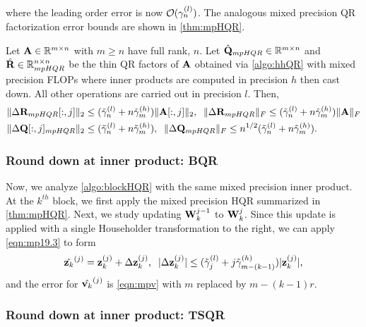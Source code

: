 where the leading order error is now $\mathcal{O}(\gamma_n^{(l)})$.
The analogous mixed precision QR factorization error bounds are shown in \cref{thm:mpHQR}.
\begin{theorem}
	\label{thm:mpHQR}
	Let $\mathbf{A}\in\mathbb{R}^{m\times n}$ with $m\geq n$ have full rank, $n$. 
	Let $\hat{\mathbf{Q}}_{mpHQR}\in\mathbb{R}^{m\times n}$ and $\hat{\mathbf{R}}\in\mathbb{R}^{n\times n}_{mpHQR}$ be the thin QR factors of $\mathbf{A}$ obtained via \cref{algo:hhQR} with mixed precision FLOPs where inner products are computed in precision $h$ then cast down.
	All other operations are carried out in precision $l$.
	Then,
	\begin{align*}
	\|\Delta \mathbf{R}_{mpHQR}[:,j]\|_2&\leq (\tilde{\gamma}_n^{(l)}+n\tilde{\gamma}_m^{(h)}) \|\mathbf{A}[:,j]\|_2,\;\; \|\Delta \mathbf{R}_{mpHQR}\|_F\leq (\tilde{\gamma}_n^{(l)}+n\tilde{\gamma}_m^{(h)}) \|\mathbf{A}\|_F\\
	\|\Delta \mathbf{Q}[:,j]_{mpHQR}\|_2&\leq (\tilde{\gamma}_n^{(l)}+n\tilde{\gamma}_m^{(h)}),\;\; \|\Delta \mathbf{Q}_{mpHQR}\|_F \leq n^{1/2} (\tilde{\gamma}_n^{(l)}+n\tilde{\gamma}_m^{(h)}).
	\end{align*}
\end{theorem}


\subsubsection{Round down at inner product: BQR}
Now, we analyze \cref{algo:blockHQR} with the same mixed precision inner product. 
At the $k^{th}$ block, we first apply the mixed precision HQR summarized in \cref{thm:mpHQR}.
Next, we study updating $\mathbf{W}_{k}^{j-1}$ to $\mathbf{W}_{k}^{j}$.
Since this update is applied with a single Householder transformation to the right, we can apply \cref{eqn:mp19.3} to form 
\begin{equation}
	\hat{\bb{z}_{k}}^{(j)}= \bb{z}_{k}^{(j)} + \Delta \bb{z}_{k}^{(j)},\;\; |\Delta \bb{z}_{k}^{(j)}| \leq(\tilde{\gamma}_j^{(l)}+j\tilde{\gamma}_{m-(k-1)}^{(h)})  |\bb{z}_{k}^{(j)}|\label{eqn:mpBQR-z},
\end{equation}
and the error for $\hat{\mathbf{v}_{k}}^{(j)}$ is \cref{eqn:mpv} with $m$ replaced by $m-(k-1)r$.


\subsubsection{Round down at inner product: TSQR}
